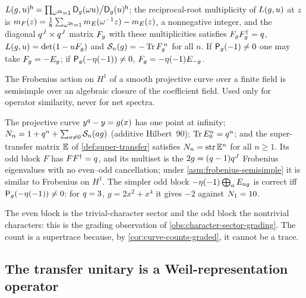 \begin{theorem}
\label{thm:as-frobenius-block}
$L(g,u)^{\mathsf h} = \prod_{\omega^{2\mathsf h}=1}\mathsf D_{g}(\omega u)\big/\mathsf D_{g}(u)^{\mathsf h}$;
the reciprocal-root multiplicity of $L(g,u)$ at $z$ is
$m_F(z) = \frac1{\mathsf h}\sum_{\omega^{2\mathsf h}=1}m_E(\omega^{-1}z) - m_E(z)$, a nonnegative
integer, and the diagonal $q^{J}\times q^{J}$ matrix $F_{g}$ with these
multiplicities satisfies $F_{g}F_{g}^\dagger = q$, $L(g,u) =
\det(1-uF_{g})$ and $\mathcal S_{n}(g) = -\operatorname{Tr}F_{g}^{\,n}$ for all $n$. If
$\mathsf P_{g}(-1)\ne0$ one may take $F_{g} = -E_g$; if $\mathsf P_{g}(-\eta(-1))\ne0$,
$F_{g} = -\eta(-1)E_{-g}$.
\end{theorem}

\begin{assumption}
\label{asm:frobenius-semisimple}
The Frobenius action on $H^1$ of a smooth projective curve over a finite field is
semisimple over an algebraic closure of the coefficient field. Used only for operator
similarity, never for net spectra.
\end{assumption}

\begin{theorem}
\label{thm:as-super-transfer}
The projective curve $y^{q}-y = g(x)$ has one point at infinity; $N_{n} = 1 + q^n +
\sum_{a\ne0}\mathcal S_{n}(ag)$ (additive Hilbert~90); $\operatorname{Tr} E_0^n = q^n$; and the
super-transfer matrix $\mathbb E$ of \cref{def:super-transfer} satisfies
$N_{n} = \operatorname{str}\mathbb E^{n}$ for all $n\ge1$. Its odd block $F$ has $FF^\dagger = q$, and
its multiset is the $2g = (q-1)q^{J}$ Frobenius eigenvalues with no even--odd
cancellation; under \cref{asm:frobenius-semisimple} it is similar to Frobenius on $H^1$.
The simpler odd block $-\eta(-1)\bigoplus_aE_{ag}$ is correct iff
$\mathsf P_{g}(-\eta(-1))\ne0$: for $q=3$, $g = 2x^2+x^4$ it gives $-2$ against $N_{1} = 10$.
\end{theorem}

The even block is the trivial-character sector and the odd block the nontrivial
characters: this is the grading observation of \cref{obs:character-sector-grading}. The
count is a supertrace because, by \cref{cor:curve-counts-graded}, it cannot be a trace.

\subsection{The transfer unitary is a Weil-representation operator}

